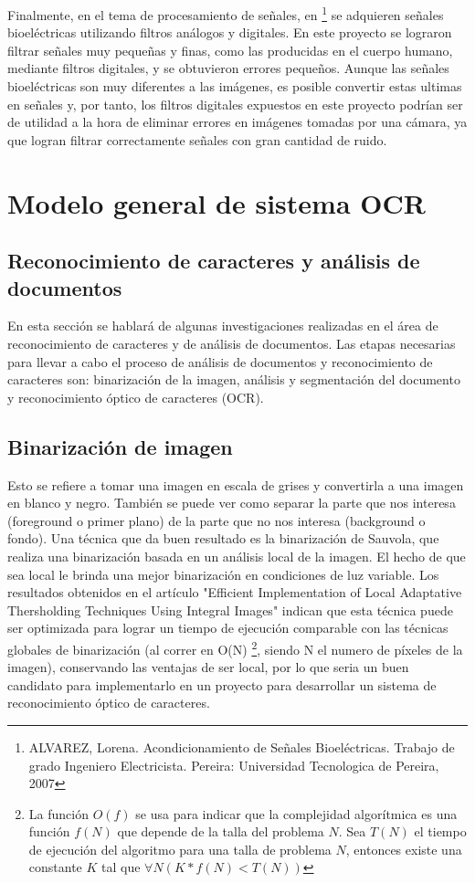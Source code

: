 \documentclass[a4paper, 11pt, oneside]{report}
\begin{document}
Finalmente, en el tema de procesamiento de señales, en \footnote{ALVAREZ, Lorena. Acondicionamiento de Señales Bioeléctricas. Trabajo de grado Ingeniero Electricista. Pereira: Universidad Tecnologica de Pereira, 2007} se adquieren señales bioeléctricas utilizando filtros análogos y digitales. En este proyecto se lograron filtrar señales muy pequeñas y finas, como las producidas en el cuerpo humano, mediante filtros digitales, y se obtuvieron errores pequeños. Aunque las señales bioeléctricas son muy diferentes a las imágenes, es posible convertir estas ultimas en señales y, por tanto, los filtros digitales expuestos en este proyecto podrían ser de utilidad a la hora de eliminar errores en imágenes tomadas por una cámara, ya que logran filtrar correctamente señales con gran cantidad de ruido.\newline
    
\section {Modelo general de sistema OCR}

\subsection{Reconocimiento de caracteres y análisis de documentos}

En esta sección se hablará de algunas investigaciones realizadas en el área de reconocimiento de caracteres y de análisis de documentos. Las etapas necesarias para llevar a cabo el proceso de análisis de documentos y reconocimiento de caracteres son: binarización de la imagen, análisis y segmentación del documento y reconocimiento óptico de caracteres (OCR).  

\subsection{Binarización de imagen}

Esto se refiere a tomar una imagen en escala de grises y convertirla a una  imagen en blanco y negro. También se puede ver como separar la parte que nos interesa (foreground o primer plano) de la parte que no nos interesa (background o fondo). Una técnica que da buen resultado es la binarización de Sauvola, que realiza una binarización basada en un análisis local de la imagen. El hecho de que sea local le brinda una mejor binarización en condiciones de luz variable. Los  resultados obtenidos en el artículo "Efficient Implementation of Local Adaptative  Thersholding Techniques Using Integral Images" indican que esta técnica puede ser optimizada para lograr un tiempo de ejecución comparable con las técnicas globales de  binarización (al correr en O(N) \footnote{La función $O(f)$ se usa para indicar que la complejidad algorítmica es una función $f(N)$ que depende de la talla del problema $N$. Sea $T(N)$ el tiempo de  ejecución del algoritmo para una talla de problema $N$, entonces existe una constante $K$ tal que  $\forall N ( K*f(N) < T(N) ) $}, siendo N el numero de píxeles de la imagen), conservando las ventajas de ser local, por lo que seria un buen candidato para implementarlo en un proyecto para desarrollar un sistema de reconocimiento óptico de caracteres.
\end{document}
